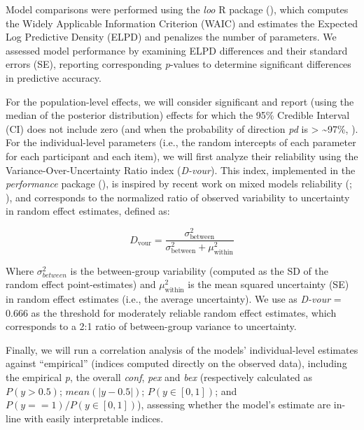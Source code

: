 \documentclass[
  jou,
  floatsintext,
  longtable,
  nolmodern,
  notxfonts,
  notimes,
  colorlinks=true,linkcolor=blue,citecolor=blue,urlcolor=blue]{apa7}
\begin{document}
Model comparisons were performed using the \emph{loo} R package
(), which
computes the Widely Applicable Information Criterion (WAIC) and
estimates the Expected Log Predictive Density (ELPD) and penalizes the
number of parameters. We assessed model performance by examining ELPD
differences and their standard errors (SE), reporting corresponding
\emph{p}-values to determine significant differences in predictive
accuracy.

For the population-level effects, we will consider significant and
report (using the median of the posterior distribution) effects for
which the 95\% Credible Interval (CI) does not include zero (and when
the probability of direction \emph{pd} is \textgreater{}
\textasciitilde97\%, ). For the individual-level parameters (i.e.,
the random intercepts of each parameter for each participant and each
item), we will first analyze their reliability using the
Variance-Over-Uncertainty Ratio index (\emph{D-vour}). This index,
implemented in the \emph{performance} package
(), is
inspired by recent work on mixed models reliability
(;
), and
corresponds to the normalized ratio of observed variability to
uncertainty in random effect estimates, defined as:

\[
D_{\text{vour}} = \frac{\sigma_{\text{between}}^2}{\sigma_{\text{between}}^2 + \mu_{\text{within}}^2}
\]

Where \(\sigma_{between}^2\) is the between-group variability (computed
as the SD of the random effect point-estimates) and
\(\mu_{\text{within}}^2\) is the mean squared uncertainty (SE) in random
effect estimates (i.e., the average uncertainty). We use as
\emph{D-vour} = 0.666 as the threshold for moderately reliable random
effect estimates, which corresponds to a 2:1 ratio of between-group
variance to uncertainty.

Finally, we will run a correlation analysis of the models'
individual-level estimates against ``empirical'' (indices computed
directly on the observed data), including the empirical \emph{p}, the
overall \emph{conf}, \emph{pex} and \emph{bex} (respectively calculated
as \(P(y > 0.5)\); \(mean(|y - 0.5|)\); \(P(y \in [0, 1])\); and
\(P(y == 1) / P(y \in [0, 1])\)), assessing whether the model's estimate
are in-line with easily interpretable indices.
\end{document}
